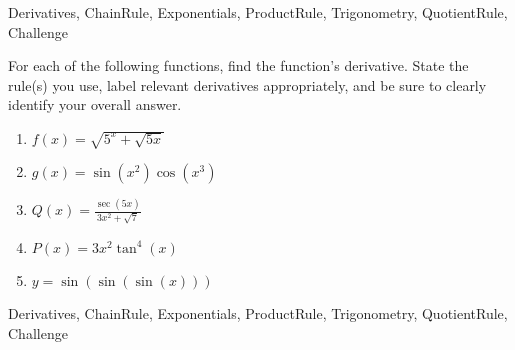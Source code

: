 

	
\begin{tagblock}{Derivatives, ChainRule, Exponentials, ProductRule, Trigonometry, QuotientRule, Challenge}
\begin{question}
	

For each of the following functions, find the function's derivative. State the rule(s) you use, label relevant derivatives appropriately, and be sure to clearly identify your overall answer.
 \begin{enumerate}

\item $ f(x) = \sqrt{5^x + \sqrt{5x}}$

\vspace{1in}
\item $g(x) = \sin(x^2)\cos(x^3)$

\vspace{1in}

\item $ \displaystyle Q(x) = \frac{\sec(5x)}{3x^2 + \sqrt{7}}$
\vspace{1in}


\item $ P(x) = 3x^2 \tan^4(x)$
\vspace{1in}
\item $ y = \sin(\sin (\sin (x)))$
\vspace{1in}


\end{enumerate}


	
\begin{tags}
	    Derivatives, ChainRule, Exponentials, ProductRule, Trigonometry, QuotientRule, Challenge
\end{tags}
	
\begin{diary}
\end{diary}
	
\begin{solution}
	   
\end{solution}
	
\end{question}

\end{tagblock}



